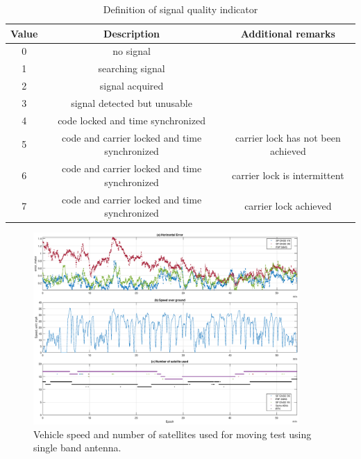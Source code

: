 \documentclass[letterpaper, 10 pt,onecolumn]{article}
\begin{document}
	
	
	\begin{table}[H]
		\centering
		\begin{tabular}{|c|c|c|}
			\hline
			Value & Description                                   & Additional remarks                 \\ \hline
			0     & no signal                                     &                                    \\ \hline
			1     & searching signal                              &                                    \\ \hline
			2     & signal acquired                               &                                    \\ \hline
			3     & signal detected but unusable                  &                                    \\ \hline
			4     & code locked and time synchronized             &                                    \\ \hline
			5     & code and carrier locked and time synchronized & carrier lock has not been achieved \\ \hline
			6     & code and carrier locked and time synchronized & carrier lock is intermittent       \\ \hline
			7     & code and carrier locked and time synchronized & carrier lock achieved              \\ \hline
		\end{tabular}
		\caption{Definition of signal quality indicator}
		\label{tab:qi}
	\end{table}
	\clearpage
	
	\begin{figure}[H]
		\centering
		\includegraphics[width=0.9\textwidth]{figures/dynamicinfo_single.eps}
		\caption{Vehicle speed and number of satellites used for moving test using single band antenna.}
		\label{fig:m1vspeed}
	\end{figure}
	
\end{document}
